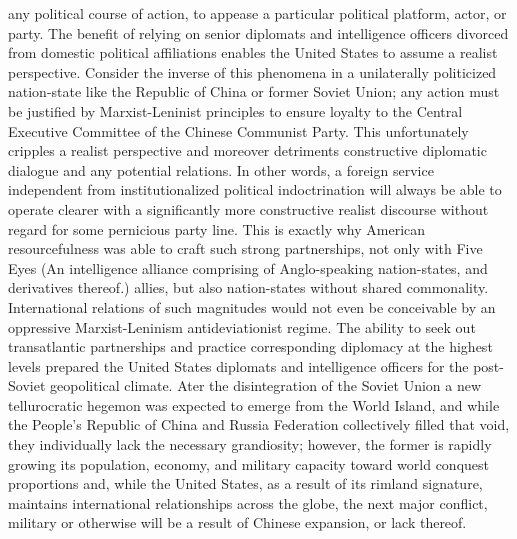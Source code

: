 \documentclass[12pt]{article}
\begin{document}
any political course of action, to appease a particular political platform, actor, or party. The benefit of relying on senior diplomats and intelligence officers divorced from domestic political affiliations enables the United States to assume a realist perspective. Consider the inverse of this phenomena in a unilaterally politicized nation-state like the Republic of China or former Soviet Union; any action must be justified by Marxist-Leninist principles to ensure loyalty to the Central Executive Committee of the Chinese Communist Party. This unfortunately cripples a realist perspective and moreover detriments constructive diplomatic dialogue and any potential relations. In other words, a foreign service independent from institutionalized political indoctrination will always be able to operate clearer with a significantly more constructive realist discourse without regard for some pernicious party line. This is exactly why American resourcefulness was able to craft such strong partnerships, not only with Five Eyes (An intelligence alliance comprising of Anglo-speaking nation-states, and derivatives thereof.) allies, but also nation-states without shared commonality. International relations of such magnitudes would not even be conceivable by an oppressive Marxist-Leninism antideviationist regime. The ability to seek out transatlantic partnerships and practice corresponding diplomacy at the highest levels prepared the United States diplomats and intelligence officers for the post-Soviet geopolitical climate. Ater the disintegration of the Soviet Union a new tellurocratic hegemon was expected to emerge from the World Island, and while the People's Republic of China and Russia Federation collectively filled that void, they individually lack the necessary grandiosity; however, the former is rapidly growing its population, economy, and military capacity toward world conquest proportions and, while the United States, as a result of its rimland signature, maintains international relationships across the globe, the next major conflict, military or otherwise will be a result of Chinese expansion, or lack thereof.
\end{document}
